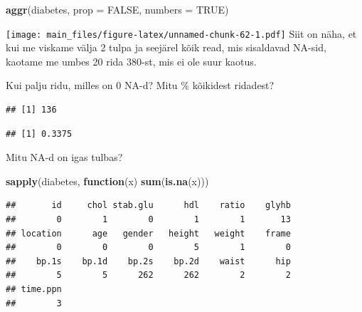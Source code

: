 \documentclass[]{book}
\newenvironment{Shaded}{\begin{snugshade}}{\end{snugshade}}
\newcommand{\KeywordTok}[1]{\textcolor[rgb]{0.13,0.29,0.53}{\textbf{#1}}}
\newcommand{\DataTypeTok}[1]{\textcolor[rgb]{0.13,0.29,0.53}{#1}}
\newcommand{\StringTok}[1]{\textcolor[rgb]{0.31,0.60,0.02}{#1}}
\newcommand{\CommentTok}[1]{\textcolor[rgb]{0.56,0.35,0.01}{\textit{#1}}}
\newcommand{\OtherTok}[1]{\textcolor[rgb]{0.56,0.35,0.01}{#1}}
\newcommand{\ControlFlowTok}[1]{\textcolor[rgb]{0.13,0.29,0.53}{\textbf{#1}}}
\newcommand{\OperatorTok}[1]{\textcolor[rgb]{0.81,0.36,0.00}{\textbf{#1}}}
\newcommand{\NormalTok}[1]{#1}
\begin{document}
\begin{Shaded}
\begin{Highlighting}[]
\KeywordTok{aggr}\NormalTok{(diabetes, }\DataTypeTok{prop =} \OtherTok{FALSE}\NormalTok{, }\DataTypeTok{numbers =} \OtherTok{TRUE}\NormalTok{)}
\end{Highlighting}
\end{Shaded}

\texttt{[image: main\_files/figure-latex/unnamed-chunk-62-1.pdf]} Siit on
näha, et kui me viskame välja 2 tulpa ja seejärel kõik read, mis
sisaldavad NA-sid, kaotame me umbes 20 rida 380-st, mis ei ole suur
kaotus.

Kui palju ridu, milles on 0 NA-d? Mitu \% kõikidest ridadest?

\begin{Shaded}
\end{Shaded}

\begin{verbatim}
## [1] 136
\end{verbatim}

\begin{Shaded}
\end{Shaded}

\begin{verbatim}
## [1] 0.3375
\end{verbatim}

Mitu NA-d on igas tulbas?

\begin{Shaded}
\begin{Highlighting}[]
\KeywordTok{sapply}\NormalTok{(diabetes, }\ControlFlowTok{function}\NormalTok{(x) }\KeywordTok{sum}\NormalTok{(}\KeywordTok{is.na}\NormalTok{(x))) }
\end{Highlighting}
\end{Shaded}

\begin{verbatim}
##       id     chol stab.glu      hdl    ratio    glyhb 
##        0        1        0        1        1       13 
## location      age   gender   height   weight    frame 
##        0        0        0        5        1        0 
##    bp.1s    bp.1d    bp.2s    bp.2d    waist      hip 
##        5        5      262      262        2        2 
## time.ppn 
##        3
\end{verbatim}
\end{document}
